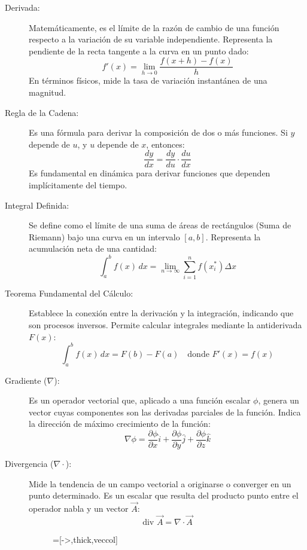 \begin{description}
    \item[Derivada:] Matemáticamente, es el límite de la razón de cambio de una función respecto a la variación de su variable independiente. Representa la pendiente de la recta tangente a la curva en un punto dado:
    $$f'(x) = \lim_{h \to 0} \frac{f(x+h) - f(x)}{h}$$
    En términos físicos, mide la tasa de variación instantánea de una magnitud.

    \item[Regla de la Cadena:] Es una fórmula para derivar la composición de dos o más funciones. Si $y$ depende de $u$, y $u$ depende de $x$, entonces:
    $$\frac{dy}{dx} = \frac{dy}{du} \cdot \frac{du}{dx}$$
    Es fundamental en dinámica para derivar funciones que dependen implícitamente del tiempo.

    \item[Integral Definida:] Se define como el límite de una suma de áreas de rectángulos (Suma de Riemann) bajo una curva en un intervalo $[a, b]$. Representa la acumulación neta de una cantidad:
    $$\int_{a}^{b} f(x) \, dx = \lim_{n \to \infty} \sum_{i=1}^{n} f(x_i^*) \Delta x$$

    \item[Teorema Fundamental del Cálculo:] Establece la conexión entre la derivación y la integración, indicando que son procesos inversos. Permite calcular integrales mediante la antiderivada $F(x)$:
    $$\int_{a}^{b} f(x) \, dx = F(b) - F(a) \quad \text{donde } F'(x) = f(x)$$

    \item[Gradiente ($\nabla$):] Es un operador vectorial que, aplicado a una función escalar $\phi$, genera un vector cuyas componentes son las derivadas parciales de la función. Indica la dirección de máximo crecimiento de la función:
    $$\nabla \phi = \frac{\partial \phi}{\partial x}\hat{i} + \frac{\partial \phi}{\partial y}\hat{j} + \frac{\partial \phi}{\partial z}\hat{k}$$

    \item[Divergencia ($\nabla \cdot$):] Mide la tendencia de un campo vectorial a originarse o converger en un punto determinado. Es un escalar que resulta del producto punto entre el operador nabla y un vector $\vec{A}$:
    $$\text{div } \vec{A} = \nabla \cdot \vec{A}$$

    \begin{figure}[!ht]
        \centering
        \tikzset{>=latex}
        =[->,thick,veccol]
        \def\Rad{1.4}
        \def\rad{0.03}
        \def\N{9}


\end{figure}
\end{description}
